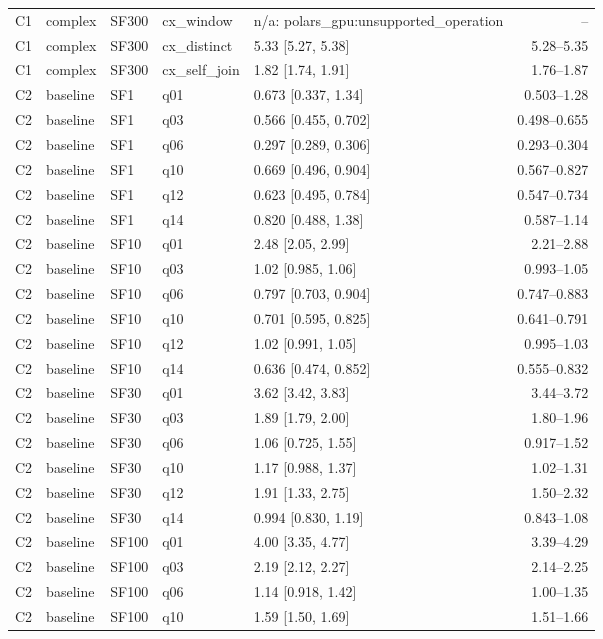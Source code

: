 \begin{longtable}{lllllr}
C1 & complex & SF300 & cx\_window & n/a: polars\_gpu:unsupported\_operation & -- \\
C1 & complex & SF300 & cx\_distinct & 5.33 [5.27, 5.38] & 5.28--5.35 \\
C1 & complex & SF300 & cx\_self\_join & 1.82 [1.74, 1.91] & 1.76--1.87 \\
C2 & baseline & SF1 & q01 & 0.673 [0.337, 1.34] & 0.503--1.28 \\
C2 & baseline & SF1 & q03 & 0.566 [0.455, 0.702] & 0.498--0.655 \\
C2 & baseline & SF1 & q06 & 0.297 [0.289, 0.306] & 0.293--0.304 \\
C2 & baseline & SF1 & q10 & 0.669 [0.496, 0.904] & 0.567--0.827 \\
C2 & baseline & SF1 & q12 & 0.623 [0.495, 0.784] & 0.547--0.734 \\
C2 & baseline & SF1 & q14 & 0.820 [0.488, 1.38] & 0.587--1.14 \\
C2 & baseline & SF10 & q01 & 2.48 [2.05, 2.99] & 2.21--2.88 \\
C2 & baseline & SF10 & q03 & 1.02 [0.985, 1.06] & 0.993--1.05 \\
C2 & baseline & SF10 & q06 & 0.797 [0.703, 0.904] & 0.747--0.883 \\
C2 & baseline & SF10 & q10 & 0.701 [0.595, 0.825] & 0.641--0.791 \\
C2 & baseline & SF10 & q12 & 1.02 [0.991, 1.05] & 0.995--1.03 \\
C2 & baseline & SF10 & q14 & 0.636 [0.474, 0.852] & 0.555--0.832 \\
C2 & baseline & SF30 & q01 & 3.62 [3.42, 3.83] & 3.44--3.72 \\
C2 & baseline & SF30 & q03 & 1.89 [1.79, 2.00] & 1.80--1.96 \\
C2 & baseline & SF30 & q06 & 1.06 [0.725, 1.55] & 0.917--1.52 \\
C2 & baseline & SF30 & q10 & 1.17 [0.988, 1.37] & 1.02--1.31 \\
C2 & baseline & SF30 & q12 & 1.91 [1.33, 2.75] & 1.50--2.32 \\
C2 & baseline & SF30 & q14 & 0.994 [0.830, 1.19] & 0.843--1.08 \\
C2 & baseline & SF100 & q01 & 4.00 [3.35, 4.77] & 3.39--4.29 \\
C2 & baseline & SF100 & q03 & 2.19 [2.12, 2.27] & 2.14--2.25 \\
C2 & baseline & SF100 & q06 & 1.14 [0.918, 1.42] & 1.00--1.35 \\
C2 & baseline & SF100 & q10 & 1.59 [1.50, 1.69] & 1.51--1.66 \\

\end{longtable}
